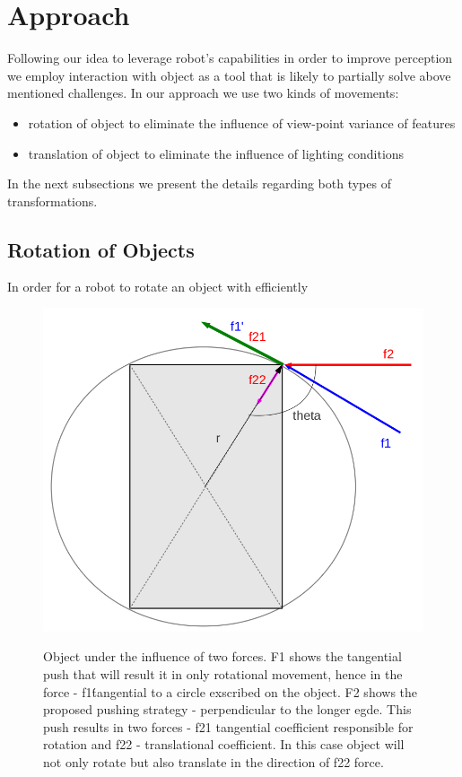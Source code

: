 \section{Approach}

Following our idea to leverage robot's capabilities in order to improve perception we employ interaction with object as a tool that is likely to partially solve above mentioned challenges. In our approach we use two kinds of movements:

\begin{itemize}
\item rotation of object to eliminate the influence of view-point variance of features
\item translation of object to eliminate the influence of lighting conditions
\end{itemize}

In the next subsections we present the details regarding both types of transformations.

\subsection{Rotation of Objects}
In order for a robot to rotate an object with efficiently 

\begin{figure}

\includegraphics[width=1\columnwidth]{figures/rectangle-angle.png}\\


\caption{Object under the influence of two forces. F1 shows the tangential push that will result it in only rotational movement, hence in the force - f1\' tangential to a circle exscribed on the object. F2 shows the proposed pushing strategy - perpendicular to the longer egde. This push results in two forces - f21 tangential coefficient responsible for rotation and f22 - translational coefficient. In this case object will not only rotate but also translate in the direction of f22 force.  }
\label{fig:angles}
\end{figure}


